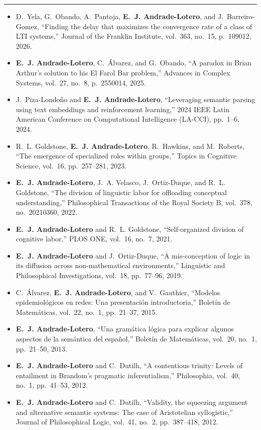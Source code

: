 \documentclass[10pt]{article}
\newcommand{\cvsection}[1]{%
  \par\vspace{0.55em}%
  \noindent{\sffamily\bfseries\MakeUppercase{#1}}\par
  \vspace{-0.35em}%
  \noindent\rule{\textwidth}{0.4pt}\par
  \vspace{0.2em}%
}
\begin{document}
\cvsection{Publications: Research Articles}
\begin{itemize}
  \item D.~Yela, G.~Obando, A.~Pantoja, \textbf{E.~J. Andrade-Lotero}, and J.~Barreiro-Gomez, ``Finding the delay that maximizes the convergence rate of a class of LTI systems,'' {Journal of the Franklin Institute}, vol.~363, no.~15, p.~109012, 2026.
  \item \textbf{E.~J. Andrade-Lotero}, C.~\'Alvarez, and G.~Obando, ``A paradox in Brian Arthur's solution to his El Farol Bar problem,'' {Advances in Complex Systems}, vol.~27, no.~8, p.~2550014, 2025.
  \item J.~Piza-Londo\~no and \textbf{E.~J. Andrade-Lotero}, ``Leveraging semantic parsing using text embeddings and reinforcement learning,'' {2024 IEEE Latin American Conference on Computational Intelligence (LA-CCI)}, pp.~1--6, 2024.
  \item R.~L. Goldstone, \textbf{E.~J. Andrade-Lotero}, R.~Hawkins, and M.~Roberts, ``The emergence of specialized roles within groups,'' {Topics in Cognitive Science}, vol.~16, pp.~257--281, 2023.
  \item \textbf{E.~J. Andrade-Lotero}, J.~A. Velasco, J.~Ortiz-Duque, and R.~L. Goldstone, ``The division of linguistic labor for offloading conceptual understanding,'' {Philosophical Transactions of the Royal Society B}, vol.~378, no.~20210360, 2022.
  \item \textbf{E.~J. Andrade-Lotero} and R.~L. Goldstone, ``Self-organized division of cognitive labor,'' {PLOS ONE}, vol.~16, no.~7, 2021.
  \item \textbf{E.~J. Andrade-Lotero} and J.~Ortiz-Duque, ``A mis-conception of logic in its diffusion across non-mathematical environments,'' {Linguistic and Philosophical Investigations}, vol.~18, pp.~77--96, 2019.
  \item C.~\'Alvarez, \textbf{E.~J. Andrade-Lotero}, and V.~Gauthier, ``Modelos epidemiol\'ogicos en redes: Una presentaci\'on introductoria,'' {Bolet\'in de Matem\'aticas}, vol.~22, no.~1, pp.~21--37, 2015.
  \item \textbf{E.~J. Andrade-Lotero}, ``Una gram\'atica l\'ogica para explicar algunos aspectos de la sem\'antica del espa\~nol,'' {Bolet\'in de Matem\'aticas}, vol.~20, no.~1, pp.~21--50, 2013.
  \item \textbf{E.~J. Andrade-Lotero} and C.~Dutilh, ``A contentious trinity: Levels of entailment in Brandom's pragmatic inferentialism,'' {Philosophia}, vol.~40, no.~1, pp.~41--53, 2012.
  \item \textbf{E.~J. Andrade-Lotero} and C.~Dutilh, ``Validity, the squeezing argument and alternative semantic systems: The case of Aristotelian syllogistic,'' {Journal of Philosophical Logic}, vol.~41, no.~2, pp.~387--418, 2012.

\end{itemize}
\end{document}
